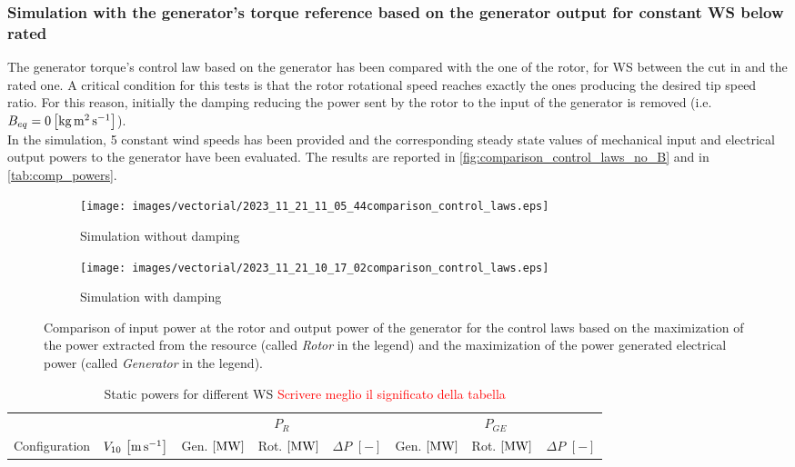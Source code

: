 \subsubsection{Simulation with the generator's torque reference based on the generator output for constant WS below rated}
The generator torque's control law based on the generator has been compared with the one of the rotor, for WS between the cut in and the rated one. A critical condition for this tests is that the rotor rotational speed reaches exactly the ones producing the desired tip speed ratio. For this reason, initially the damping reducing the power sent by the rotor to the input of the generator is removed (i.e. $B_{eq}=0 \left[\si{\kilo\gram\square\meter\per\second}\right]$). \\
In the simulation, 5 constant wind speeds has been provided and the corresponding steady state values of mechanical input and electrical output powers to the generator have been evaluated. The results are reported in \autoref{fig:comparison_control_laws_no_B} and in \autoref{tab:comp_powers}.
\begin{figure}[htb]
  \centering
  \begin{subfigure}{\columnwidth}
    \texttt{[image: images/vectorial/2023\_11\_21\_11\_05\_44comparison\_control\_laws.eps]}
    \caption{Simulation without damping}
    \label{fig:comparison_control_laws_no_B}
  \end{subfigure}
  \begin{subfigure}{\columnwidth}
    \texttt{[image: images/vectorial/2023\_11\_21\_10\_17\_02comparison\_control\_laws.eps]}
    \caption{Simulation with damping}
    \label{fig:comparison_control_laws_B}
  \end{subfigure}
  \caption{Comparison of input power at the rotor and output power of the generator for the control laws based on the maximization of the power extracted from the resource (called \textit{Rotor} in the legend) and the maximization of the power generated electrical power (called \textit{Generator} in the legend).}
  \label{fig:comparison_control_laws}
\end{figure}

\begin{table}[htb]
  \caption{Static powers for different WS \textcolor{red}{Scrivere meglio il significato della tabella}}
  \begin{tabular}{cc|ccc|ccc}
    \toprule
    & & \multicolumn{3}{c|}{$P_R$} & \multicolumn{3}{c}{$P_{GE}$} \\
    Configuration & $V_{10} \, \left[\si{\meter\per\second}\right]$ & Gen. $\left[\si{\mega\watt}\right]$ & Rot. $\left[\si{\mega\watt}\right]$ & $\Delta P$ $\left[-\right]$  & Gen. $\left[\si{\mega\watt}\right]$ & Rot. $\left[\si{\mega\watt}\right]$ & $\Delta P$ $\left[-\right]$\\ \midrule
     
     
  \end{tabular}
  \label{tab:comp_powers}
\end{table}

